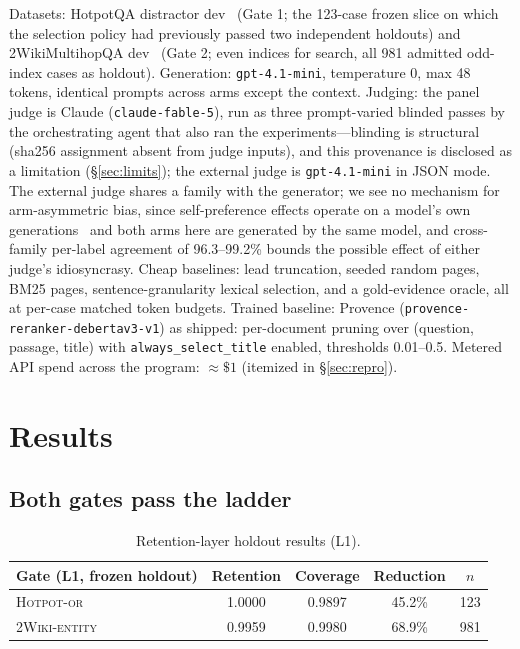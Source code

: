 \documentclass[11pt]{article}
\newcommand{\gateone}{\textsc{Hotpot-or}}
\newcommand{\gatetwo}{\textsc{2Wiki-entity}}
\begin{document}
Datasets: HotpotQA distractor dev~\citep{yang2018hotpotqa} (Gate 1; the
123-case frozen slice on which the selection policy had previously passed
two independent holdouts) and 2WikiMultihopQA
dev~\citep{ho2020constructing} (Gate 2; even indices for search, all 981
admitted odd-index cases as holdout). Generation: \texttt{gpt-4.1-mini},
temperature 0, max 48 tokens, identical prompts across arms except the
context. Judging: the panel judge is Claude (\texttt{claude-fable-5}), run
as three prompt-varied blinded passes by the orchestrating agent that also
ran the experiments---blinding is structural (sha256 assignment absent
from judge inputs), and this provenance is disclosed as a limitation
(\S\ref{sec:limits}); the external judge is \texttt{gpt-4.1-mini} in JSON
mode. The external judge shares a family with the generator; we see no
mechanism for arm-asymmetric bias, since self-preference effects operate
on a model's own generations~\citep{panickssery2024llm} and both arms here
are generated by the same model, and cross-family per-label agreement of
96.3--99.2\% bounds the possible effect of either judge's idiosyncrasy.
Cheap baselines: lead truncation, seeded random pages, BM25 pages,
sentence-granularity lexical selection, and a gold-evidence oracle, all at
per-case matched token budgets. Trained baseline: Provence
(\texttt{provence-reranker-debertav3-v1}) as shipped: per-document pruning
over (question, passage, title) with \texttt{always\_select\_title}
enabled, thresholds 0.01--0.5. Metered API spend across the program:
${\approx}\$1$ (itemized in \S\ref{sec:repro}).

\section{Results}

\subsection{Both gates pass the ladder}

\begin{table}[h]
\centering\small
\begin{tabular}{lcccc}
\toprule
Gate (L1, frozen holdout) & Retention & Coverage & Reduction & $n$ \\
\midrule
\gateone{}   & 1.0000 & 0.9897 & 45.2\% & 123 \\
\gatetwo{}   & 0.9959 & 0.9980 & 68.9\% & 981 \\
\bottomrule
\end{tabular}
\caption{Retention-layer holdout results (L1).}
\end{table}
\end{document}
